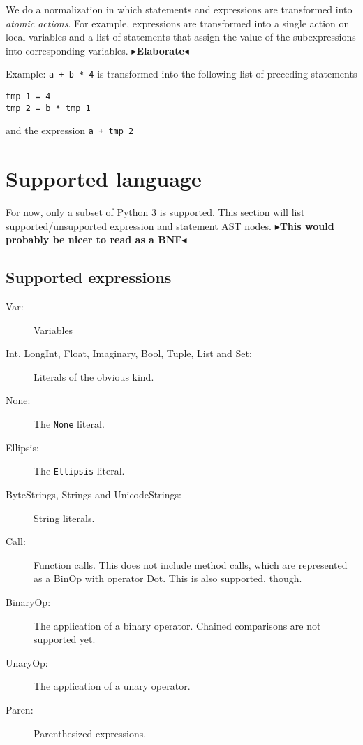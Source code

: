 \documentclass[11pt]{report}
\newcommand{\todo}[1]{{\color[rgb]{.5,0,0}\textbf{$\blacktriangleright$#1$\blacktriangleleft$}}}
\begin{document}
We do a normalization in which statements and expressions are
transformed into \emph{atomic actions}. For example, expressions are
transformed into a single action on local variables and a list of
statements that assign the value of the subexpressions into
corresponding variables. \todo{Elaborate}

Example: \verb!a + b * 4! is transformed into the following list of
preceding statements
\begin{verbatim}
tmp_1 = 4
tmp_2 = b * tmp_1
\end{verbatim}
and the expression \verb!a + tmp_2!

\section{Supported language}
For now, only a subset of Python 3 is supported. This section will
list supported/unsupported expression and statement AST nodes.
\todo{This would probably be nicer to read as a BNF}

\subsection{Supported expressions}
\begin{description}
  \item[Var:] Variables
  \item[Int, LongInt, Float, Imaginary, Bool, Tuple, List and Set:]
    Literals of the obvious kind.
  \item[None:] The \verb|None| literal.
  \item[Ellipsis:] The \verb|Ellipsis| literal.
  \item[ByteStrings, Strings and UnicodeStrings:] String literals.
  \item[Call:] Function calls. This does not include method calls,
    which are represented as a BinOp with operator Dot. This is also
    supported, though.
  \item[BinaryOp:] The application of a binary operator. Chained
    comparisons are not supported yet.
  \item[UnaryOp:] The application of a unary operator.
  \item[Paren:] Parenthesized expressions.
\end{description}
\end{document}
